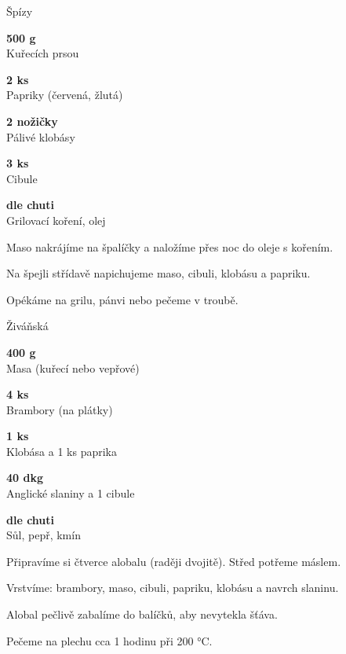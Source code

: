 \documentclass[11pt,a4paper]{article}
\begin{document}
\begin{recipe}[DarkCyan]{Špízy}
    \begin{ingredients}
        \item \parbox[t]{\linewidth}{\raggedright \weight \textbf{500 g}\\ Kuřecích prsou}
        \item \parbox[t]{\linewidth}{\raggedright \piece \textbf{2 ks}\\ Papriky (červená, žlutá)}
        \item \parbox[t]{\linewidth}{\raggedright \piece \textbf{2 nožičky}\\ Pálivé klobásy}
        \item \parbox[t]{\linewidth}{\raggedright \piece \textbf{3 ks}\\ Cibule}
        \item \parbox[t]{\linewidth}{\raggedright \indefinite \textbf{dle chuti}\\ Grilovací koření, olej}
    \end{ingredients}
    \begin{steps}
        \item Maso nakrájíme na špalíčky a naložíme přes noc do oleje s kořením.
        \item Na špejli střídavě napichujeme maso, cibuli, klobásu a papriku.
        \item Opékáme na grilu, pánvi nebo pečeme v troubě.
    \end{steps}
\end{recipe}

\begin{recipe}[Sienna]{Živáňská}
    \begin{ingredients}
        \item \parbox[t]{\linewidth}{\raggedright \weight \textbf{400 g}\\ Masa (kuřecí nebo vepřové)}
        \item \parbox[t]{\linewidth}{\raggedright \piece \textbf{4 ks}\\ Brambory (na plátky)}
        \item \parbox[t]{\linewidth}{\raggedright \piece \textbf{1 ks}\\ Klobása a 1 ks paprika}
        \item \parbox[t]{\linewidth}{\raggedright \weight \textbf{40 dkg}\\ Anglické slaniny a 1 cibule}
        \item \parbox[t]{\linewidth}{\raggedright \indefinite \textbf{dle chuti}\\ Sůl, pepř, kmín}
    \end{ingredients}
    \begin{steps}
        \item Připravíme si čtverce alobalu (raději dvojitě). Střed potřeme máslem.
        \item Vrstvíme: brambory, maso, cibuli, papriku, klobásu a navrch slaninu.
        \item Alobal pečlivě zabalíme do balíčků, aby nevytekla šťáva.
        \item Pečeme na plechu cca 1 hodinu při 200 °C.
    \end{steps}
\end{recipe}
\end{document}
